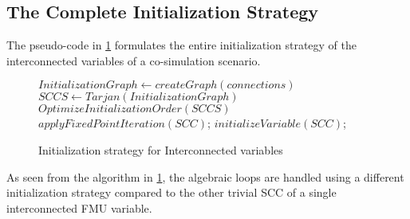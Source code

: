\subsection{The Complete Initialization Strategy}
The pseudo-code in \cref{alg:initialization} formulates the entire initialization strategy of the interconnected variables of a co-simulation scenario.
\begin{figure}[H]
  \centering
    \begin{algorithm}[H]
    \caption{Initialization strategy for Interconnected variables}
    \label{alg:initialization}
      \begin{algorithmic}[1]
        \State $InitializationGraph \gets createGraph(connections)$
        \State $SCCS \gets Tarjan(InitializationGraph)$
        \State $OptimizeInitializationOrder(SCCS)$
                \State $applyFixedPointIteration(SCC)$;
            \Else
                \State $initializeVariable(SCC)$;
            \EndIf
        \EndFor
        \end{algorithmic}
    \end{algorithm}
\end{figure}

As seen from the algorithm in \cref{alg:initialization}, the algebraic loops are handled using a different initialization strategy compared to the other trivial SCC of a single interconnected FMU variable.